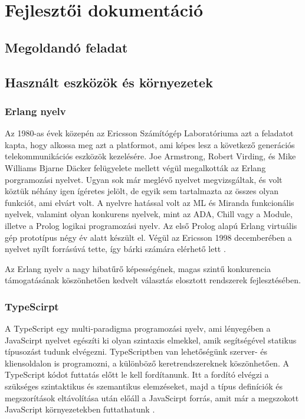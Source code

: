 

\chapter{Fejlesztői dokumentáció}
\label{ch:impl}


\section{Megoldandó feladat}
\section{Használt eszközök és környezetek} \label{usedTechnologies}
\subsection{Erlang nyelv}
Az 1980-as évek közepén az Ericsson Számítógép Laboratóriuma azt a feladatot kapta, hogy alkossa meg azt a platformot, ami képes lesz a következő generációs telekommunikációs eszközök kezelésére. Joe Armstrong, Robert Virding, és Mike Williams Bjarne Däcker felügyelete mellett végül megalkották az Erlang porgramozási nyelvet. Ugyan sok már meglévő nyelvet megvizsgáltak, és volt köztük néhány igen ígéretes jelölt, de egyik sem tartalmazta az összes olyan funkciót, ami elvárt volt. A nyelvre hatással volt az ML és Miranda funkcionális nyelvek, valamint olyan konkurens nyelvek, mint az ADA, Chill vagy a Module, illetve a Prolog logikai programozási nyelv. Az első Prolog alapú Erlang virtuális gép prototípus négy év alatt készült el. Végül az Ericsson 1998 decemberében a nyelvet nyílt forrásúvá tette, így bárki számára elérhető lett \cite{erlangBook}.

Az Erlang nyelv a nagy hibatűrő képességének, magas szintű konkurencia támogatásának köszönhetően kedvelt választás elosztott rendszerek fejlesztésében.


\subsection{TypeScirpt}

A TypeScript egy multi-paradigma programozási nyelv, ami lényegében a JavaScirpt nyelvet egészíti ki olyan szintaxis elmekkel, amik segítségével statikus típusozást tudunk elvégezni. TypeScriptben van lehetőségünk szerver- és kliensoldalon is programozni, a különböző keretrendszereknek köszönhetően. A TypeScript kódot futtatás előtt le kell fordítanunk. Itt a fordító elvégzi a szükséges szintaktikus és szemantikus elemzéseket, majd a típus definíciók és megszorítások eltávolítása után előáll a JavaScirpt forrás, amit már a megszokott JavaScript környezetekben futtathatunk \cite{webpageTS} \cite{wikipediaTS}.


